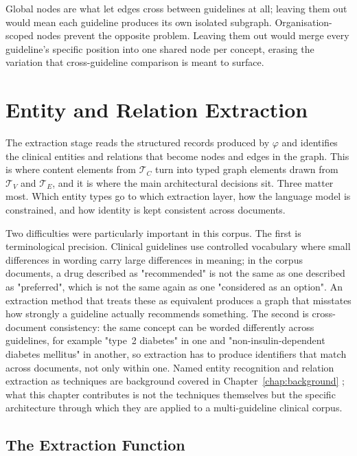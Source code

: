 Global nodes are what let edges cross between guidelines at all; leaving them out would mean each guideline produces its own isolated subgraph. Organisation-scoped nodes prevent the opposite problem. Leaving them out would merge every guideline's specific position into one shared node per concept, erasing the variation that cross-guideline comparison is meant to surface.

\section{Entity and Relation Extraction}
\label{sec:extraction}

The extraction stage reads the structured records produced by $\varphi$ and identifies the clinical entities and relations that become nodes and edges in the graph. This is where content elements from $\mathcal{T}_C$ turn into typed graph elements drawn from $\mathcal{T}_V$ and $\mathcal{T}_E$, and it is where the main architectural decisions sit. Three matter most. Which entity types go to which extraction layer, how the language model is constrained, and how identity is kept consistent across documents.

Two difficulties were particularly important in this corpus. The first is terminological precision. Clinical guidelines use controlled vocabulary where small differences in wording carry large differences in meaning; in the corpus documents, a drug described as "recommended" is not the same as one described as "preferred", which is not the same again as one "considered as an option". An extraction method that treats these as equivalent produces a graph that misstates how strongly a guideline actually recommends something. The second is cross-document consistency: the same concept can be worded differently across guidelines, for example "type~2 diabetes" in one and "non-insulin-dependent diabetes mellitus" in another, so extraction has to produce identifiers that match across documents, not only within one. Named entity recognition and relation extraction as techniques are background covered in Chapter~\ref{chap:background} \cite{nasar2021,zhao2024}; what this chapter contributes is not the techniques themselves but the specific architecture through which they are applied to a multi-guideline clinical corpus.

\subsection*{The Extraction Function}

